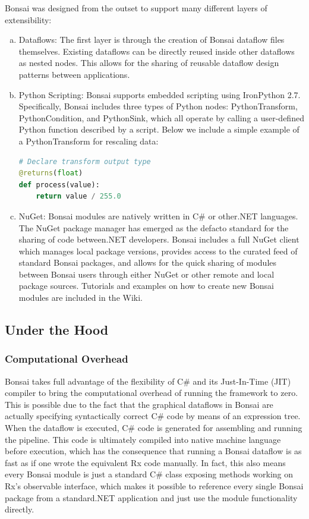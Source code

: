 Bonsai was designed from the outset to support many different layers of extensibility:
\begin{enumerate}[(a)]
    \item Dataflows: The first layer is through the creation of Bonsai dataflow files themselves. Existing dataflows can be directly reused inside other dataflows as nested nodes. This allows for the sharing of reusable dataflow design patterns between applications.
    \item Python Scripting: Bonsai supports embedded scripting using IronPython 2.7. Specifically, Bonsai includes three types of Python nodes: PythonTransform, PythonCondition, and PythonSink, which all operate by calling a user-defined Python function described by a script. Below we include a simple example of a PythonTransform for rescaling data:

    \begin{lstlisting}[language=Python]
# Declare transform output type
@returns(float)
def process(value):
    return value / 255.0
    \end{lstlisting}

    \item NuGet: Bonsai modules are natively written in C\# or other.NET languages. The NuGet package manager has emerged as the defacto standard for the sharing of code between.NET developers. Bonsai includes a full NuGet client which manages local package versions, provides access to the curated feed of standard Bonsai packages, and allows for the quick sharing of modules between Bonsai users through either NuGet or other remote and local package sources. Tutorials and examples on how to create new Bonsai modules are included in the Wiki.
\end{enumerate}

\subsection{Under the Hood}

\subsubsection{Computational Overhead}

Bonsai takes full advantage of the flexibility of C\# and its Just-In-Time (JIT) compiler to bring the computational overhead of running the framework to zero. This is possible due to the fact that the graphical dataflows in Bonsai are actually specifying syntactically correct C\# code by means of an expression tree. When the dataflow is executed, C\# code is generated for assembling and running the pipeline. This code is ultimately compiled into native machine language before execution, which has the consequence that running a Bonsai dataflow is as fast as if one wrote the equivalent Rx code manually. In fact, this also means every Bonsai module is just a standard C\# class exposing methods working on Rx's observable interface, which makes it possible to reference every single Bonsai package from a standard.NET application and just use the module functionality directly.

